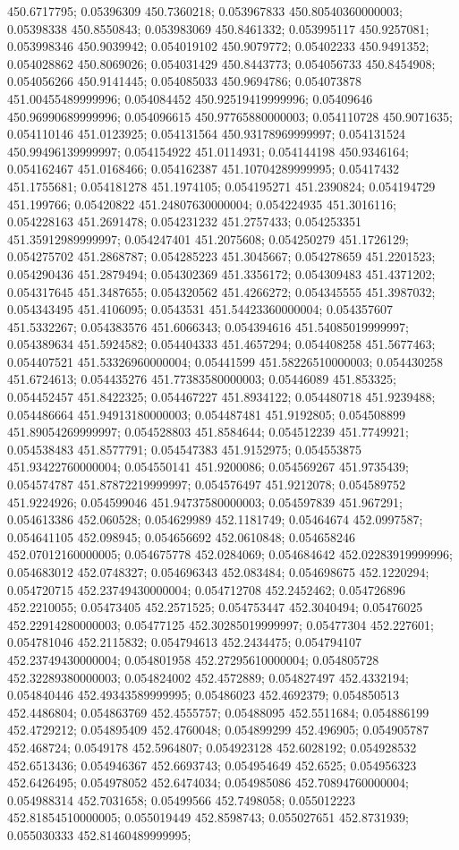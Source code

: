 450.6717795; 0.05396309 450.7360218; 0.053967833 450.80540360000003; 0.05398338 450.8550843; 0.053983069 450.8461332; 0.053995117 450.9257081; 0.053998346 450.9039942; 0.054019102 450.9079772; 0.05402233 450.9491352; 0.054028862 450.8069026; 0.054031429 450.8443773; 0.054056733 450.8454908; 0.054056266 450.9141445; 0.054085033 450.9694786; 0.054073878 451.00455489999996; 0.054084452 450.92519419999996; 0.05409646 450.96990689999996; 0.054096615 450.97765880000003; 0.054110728 450.9071635; 0.054110146 451.0123925; 0.054131564 450.93178969999997; 0.054131524 450.99496139999997; 0.054154922 451.0114931; 0.054144198 450.9346164; 0.054162467 451.0168466; 0.054162387 451.10704289999995; 0.05417432 451.1755681; 0.054181278 451.1974105; 0.054195271 451.2390824; 0.054194729 451.199766; 0.05420822 451.24807630000004; 0.054224935 451.3016116; 0.054228163 451.2691478; 0.054231232 451.2757433; 0.054253351 451.35912989999997; 0.054247401 451.2075608; 0.054250279 451.1726129; 0.054275702 451.2868787; 0.054285223 451.3045667; 0.054278659 451.2201523; 0.054290436 451.2879494; 0.054302369 451.3356172; 0.054309483 451.4371202; 0.054317645 451.3487655; 0.054320562 451.4266272; 0.054345555 451.3987032; 0.054343495 451.4106095; 0.0543531 451.54423360000004; 0.054357607 451.5332267; 0.054383576 451.6066343; 0.054394616 451.54085019999997; 0.054389634 451.5924582; 0.054404333 451.4657294; 0.054408258 451.5677463; 0.054407521 451.53326960000004; 0.05441599 451.58226510000003; 0.054430258 451.6724613; 0.054435276 451.77383580000003; 0.05446089 451.853325; 0.054452457 451.8422325; 0.054467227 451.8934122; 0.054480718 451.9239488; 0.054486664 451.94913180000003; 0.054487481 451.9192805; 0.054508899 451.89054269999997; 0.054528803 451.8584644; 0.054512239 451.7749921; 0.054538483 451.8577791; 0.054547383 451.9152975; 0.054553875 451.93422760000004; 0.054550141 451.9200086; 0.054569267 451.9735439; 0.054574787 451.87872219999997; 0.054576497 451.9212078; 0.054589752 451.9224926; 0.054599046 451.94737580000003; 0.054597839 451.967291; 0.054613386 452.060528; 0.054629989 452.1181749; 0.05464674 452.0997587; 0.054641105 452.098945; 0.054656692 452.0610848; 0.054658246 452.07012160000005; 0.054675778 452.0284069; 0.054684642 452.02283919999996; 0.054683012 452.0748327; 0.054696343 452.083484; 0.054698675 452.1220294; 0.054720715 452.23749430000004; 0.054712708 452.2452462; 0.054726896 452.2210055; 0.05473405 452.2571525; 0.054753447 452.3040494; 0.05476025 452.22914280000003; 0.05477125 452.30285019999997; 0.05477304 452.227601; 0.054781046 452.2115832; 0.054794613 452.2434475; 0.054794107 452.23749430000004; 0.054801958 452.27295610000004; 0.054805728 452.32289380000003; 0.054824002 452.4572889; 0.054827497 452.4332194; 0.054840446 452.49343589999995; 0.05486023 452.4692379; 0.054850513 452.4486804; 0.054863769 452.4555757; 0.05488095 452.5511684; 0.054886199 452.4729212; 0.054895409 452.4760048; 0.054899299 452.496905; 0.054905787 452.468724; 0.0549178 452.5964807; 0.054923128 452.6028192; 0.054928532 452.6513436; 0.054946367 452.6693743; 0.054954649 452.6525; 0.054956323 452.6426495; 0.054978052 452.6474034; 0.054985086 452.70894760000004; 0.054988314 452.7031658; 0.05499566 452.7498058; 0.055012223 452.81854510000005; 0.055019449 452.8598743; 0.055027651 452.8731939; 0.055030333 452.81460489999995; 